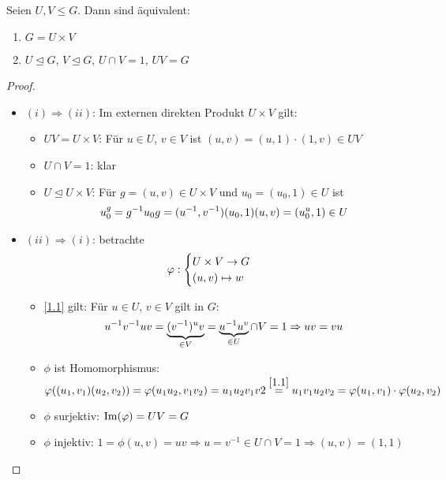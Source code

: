 \begin{proposition}
	Seien $U,V\le G$. Dann sind äquivalent:
	\begin{enumerate}[label=(\roman*)]
		\item $G=U\times V$
		\item $U\unlhd G$, $V\unlhd G$, $U\cap V=1$, $UV=G$
	\end{enumerate}
\end{proposition}
\begin{proof}
	\begin{itemize}
		\item $(i)\Rightarrow (ii)$: Im externen direkten Produkt $U\times V$ gilt:
		\begin{itemize}
			\item $UV=U\times V$: Für $u\in U$, $v\in V$ ist $(u,v)=(u,1)\cdot (1,v)\in UV$
			\item $U\cap V=1$: klar
			\item $U\unlhd U\times V$: Für $g=(u,v)\in U\times V$ und $u_0=(u_0,1)\in U$ ist 
			\begin{align}
				u_0^g = g^{-1}u_0g=(u^{-1},v^{-1})(u_0,1)(u,v)=(u_0^u,1)\in U\notag
			\end{align}
		\end{itemize}
		\item $(ii)\Rightarrow (i)$: betrachte 
		\begin{align}
			\phi: \begin{cases}
			U\times V\to G \\ (u,v)\mapsto w
			\end{cases}\notag
		\end{align}
		\begin{itemize}
			\item \cref{1.1} gilt: Für $u\in U$, $v\in V$ gilt in $G$:
			\begin{align}
				u^{-1}v^{-1}uv=\underbrace{(v^{-1})^uv}_{\in V} = \underbrace{u^{-1}u^v}_{\in U}\cap V=1\Rightarrow uv=vu\notag
			\end{align}
			\item $\phi$ ist Homomorphismus: $\phi((u_1,v_1)(u_2,v_2)) = \phi(u_1u_2,v_1v_2) = u_1u_2v_1v2 \overset{\cref{1.1}}{=} u_1v_1u_2v_2 = \phi(u_1,v_1)\cdot \phi(u_2,v_2)$
			\item $\phi$ surjektiv: $\Image(\phi)=UV=G$
			\item $\phi$ injektiv: $1=\phi(u,v) = uv\Rightarrow u=v^{-1}\in U\cap V = 1\Rightarrow (u,v) = (1,1)$
		\end{itemize}
	\end{itemize}
\end{proof}

